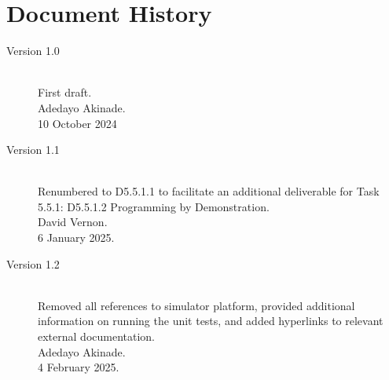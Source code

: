 \documentclass{CSSRforAfrica}
\begin{document}
 

  

\newpage
\section*{Document History}
\label{document_history}

\begin{description}

\item [Version 1.0]~\\
First draft. \\
Adedayo  Akinade. \\            
10 October 2024                                          
\item [Version 1.1]~\\
Renumbered to D5.5.1.1 to facilitate an additional deliverable for Task 5.5.1: D5.5.1.2  Programming by Demonstration.\\
David Vernon. \\                                   
6 January 2025.   

\item [Version 1.2]~\\
Removed all references to simulator platform, provided additional information on running the unit tests, and added hyperlinks to relevant external documentation.\\
Adedayo Akinade. \\                                   
4 February 2025.   

\end{description}
\end{document}
